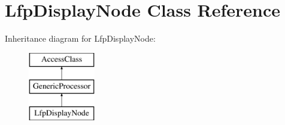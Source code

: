 \hypertarget{classLfpDisplayNode}{\section{Lfp\-Display\-Node Class Reference}
\label{classLfpDisplayNode}
}
Inheritance diagram for Lfp\-Display\-Node\-:\begin{figure}[H]
\begin{center}
\leavevmode
\includegraphics[height=3.000000cm]{classLfpDisplayNode}
\end{center}
\end{figure}
